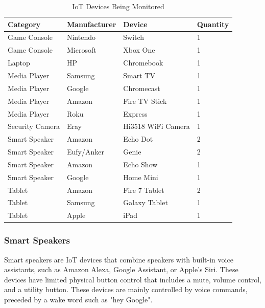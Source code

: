 \begin{table}[H]
    \centering
    \caption{IoT Devices Being Monitored}
    \begin{tabular}{@{}llll@{}}
    \toprule
    Category & Manufacturer & Device        & Quantity \\ \midrule
    Game Console & Nintendo     & Switch        & 1        \\
    Game Console & Microsoft    & Xbox One      & 1        \\
    Laptop & HP           & Chromebook    & 1        \\
    Media Player & Samsung      & Smart TV      & 1        \\
    Media Player & Google       & Chromecast    & 1        \\
    Media Player & Amazon       & Fire TV Stick    & 1        \\
    Media Player & Roku         & Express       & 1        \\
    Security Camera & Eray    & Hi3518 WiFi Camera     & 1        \\
    Smart Speaker & Amazon       & Echo Dot      & 2        \\
    Smart Speaker & Eufy/Anker   & Genie         & 2        \\
    Smart Speaker & Amazon       & Echo Show     & 1        \\
    Smart Speaker & Google       & Home Mini     & 1        \\
    Tablet & Amazon       & Fire 7 Tablet & 2        \\
    Tablet & Samsung      & Galaxy Tablet & 1        \\
    Tablet & Apple        & iPad          & 1        \\ \bottomrule
    \end{tabular}
    \label{tab:devices}
\end{table}

\subsubsection{Smart Speakers}
\label{Smart Speakers}

Smart speakers are IoT devices that combine speakers with built-in voice assistants, such as Amazon Alexa, Google Assistant, or Apple's Siri. These devices have limited physical button control that includes a mute, volume control, and a utility button. These devices are mainly controlled by voice commands, preceded by a wake word such as "hey Google".

